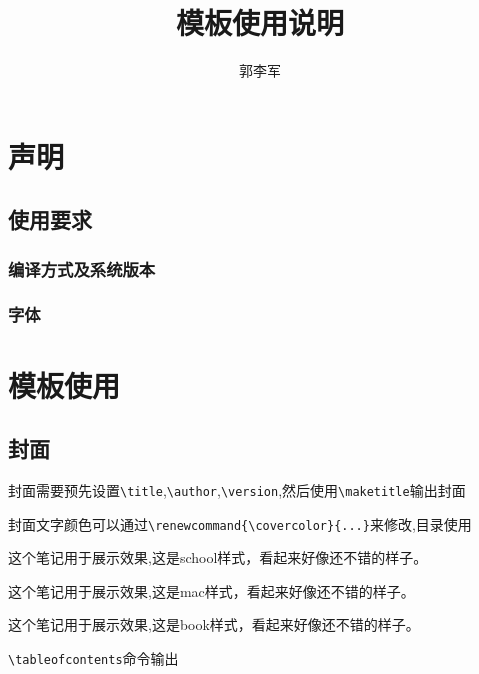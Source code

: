 \documentclass{memory}
\title{模板使用说明}
\author{郭李军}
\begin{document}
\maketitle
\tableofcontents
\setcounter{page}{1}
\Watermark
\EvenWatermark
\OddWatermark
\chapter{声明}
\section{使用要求}
\subsection{编译方式及系统版本}
\subsection{字体}
\chapter{模板使用}
\section{封面}
封面需要预先设置\verb|\title|,\verb|\author|,\verb|\version|,然后使用\verb|\maketitle|输出封面 

封面文字颜色可以通过\verb|\renewcommand{\covercolor}{...}|来修改,目录使用
\begin{note}[style=school]
    这个笔记用于展示效果,这是school样式，看起来好像还不错的样子。
\end{note}
\begin{note}[distance=5cm,style=mac]
    这个笔记用于展示效果,这是mac样式，\color{cyan}看起来好像还不错的样子。
\end{note}
\begin{note}[distance=10cm,style=book]
    这个笔记用于展示效果,这是book样式，\color{red}看起来好像还不错的样子。
\end{note}

\verb|\tableofcontents|命令输出
\end{document}
